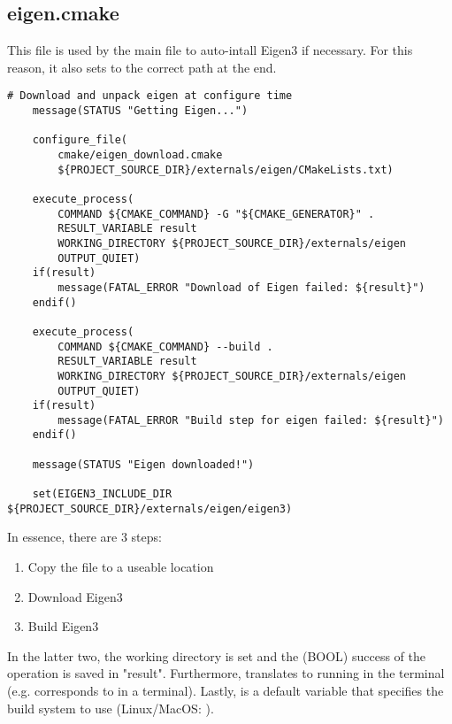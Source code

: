 \subsection{eigen.cmake} \label{ss:auto_installation/eigen.cmake}
This file is used by the main  file to auto-intall Eigen3 if necessary. For this reason, it also sets  to the correct path at the end.
\begin{lstlisting}[style=CmakeStyle]
    # Download and unpack eigen at configure time
    message(STATUS "Getting Eigen...")

    configure_file(
        cmake/eigen_download.cmake
        ${PROJECT_SOURCE_DIR}/externals/eigen/CMakeLists.txt)

    execute_process(
        COMMAND ${CMAKE_COMMAND} -G "${CMAKE_GENERATOR}" .
        RESULT_VARIABLE result
        WORKING_DIRECTORY ${PROJECT_SOURCE_DIR}/externals/eigen
        OUTPUT_QUIET)
    if(result)
        message(FATAL_ERROR "Download of Eigen failed: ${result}")
    endif()

    execute_process(
        COMMAND ${CMAKE_COMMAND} --build .
        RESULT_VARIABLE result
        WORKING_DIRECTORY ${PROJECT_SOURCE_DIR}/externals/eigen
        OUTPUT_QUIET)
    if(result)
        message(FATAL_ERROR "Build step for eigen failed: ${result}")
    endif()

    message(STATUS "Eigen downloaded!")

    set(EIGEN3_INCLUDE_DIR ${PROJECT_SOURCE_DIR}/externals/eigen/eigen3)
\end{lstlisting}

In essence, there are 3 steps:
\begin{enumerate}
    \item Copy the  file to a useable location
    \item Download Eigen3
    \item Build Eigen3
\end{enumerate}
In the latter two, the working directory is set and the (BOOL) success of the operation is saved in "result". Furthermore,  translates to running  in the terminal
(e.g.  corresponds to  in a terminal). Lastly,  is a default variable that specifies the build system to use (Linux/MacOS: ).



